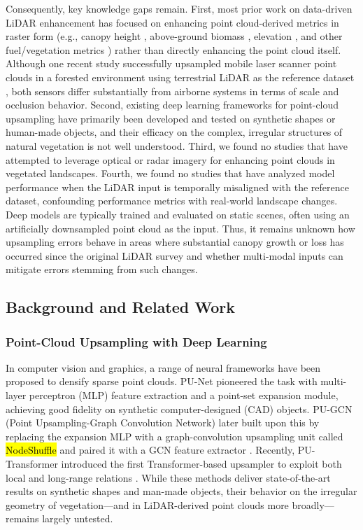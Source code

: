 \documentclass[remotesensing,article,accept,pdftex,moreauthors]{Definitions/mdpi}
\begin{document}
Consequently, key knowledge gaps remain. First, most prior work on data-driven LiDAR enhancement has focused on enhancing point cloud-derived metrics in raster form (e.g., canopy height \cite{wilkes_mapping_2015, wagner_sub-meter_2024}, above-ground biomass \cite{shendryk2022fusing}, elevation \cite{li2023large}, and other fuel/vegetation metrics \cite{taneja2023up, gazzea2023high}) rather than directly enhancing the point cloud itself. Although one recent study successfully upsampled mobile laser scanner point clouds in a forested environment using terrestrial LiDAR as the reference dataset \cite{remijnse2024upsampling}, both sensors differ substantially from airborne systems in terms of scale and occlusion behavior. Second, existing deep learning frameworks for point-cloud upsampling have primarily been developed and tested on synthetic shapes or human-made objects, and their efficacy on the complex, irregular structures of natural vegetation is not well understood. Third, we found no studies that have attempted to leverage optical or radar imagery for enhancing point clouds in vegetated landscapes. Fourth, we found no studies that have analyzed model performance when the LiDAR input is temporally misaligned with the reference dataset, confounding performance metrics with real-world landscape changes. Deep models are typically trained and evaluated on static scenes, often using an artificially downsampled point cloud as the input. Thus, it remains unknown how upsampling errors behave in areas where substantial canopy growth or loss has occurred since the original LiDAR survey and whether multi-modal inputs can mitigate errors stemming from such changes.

\subsection{Background and Related Work}

\subsubsection{Point-Cloud Upsampling with Deep Learning}

In computer vision and graphics, a range of neural frameworks have been proposed to densify sparse point clouds. PU-Net \cite{yu2018pu} pioneered the task with multi-layer perceptron (MLP) feature extraction and a point-set expansion module, achieving good fidelity on synthetic computer-designed (CAD) objects. PU-GCN (Point Upsampling-Graph Convolution Network) later built upon this by replacing the expansion MLP with a graph-convolution upsampling unit called \hl{NodeShuffle}%
 \cite{pu}
and paired it with a GCN feature extractor \cite{qian2021pu}. Recently, PU-Transformer introduced the first Transformer-based upsampler to exploit both local and long-range relations \cite{qiu2022pu}. While these methods deliver state-of-the-art results on synthetic shapes and man-made objects, their behavior on the irregular geometry of vegetation—and in LiDAR-derived point clouds more broadly—remains largely untested.
\end{document}
